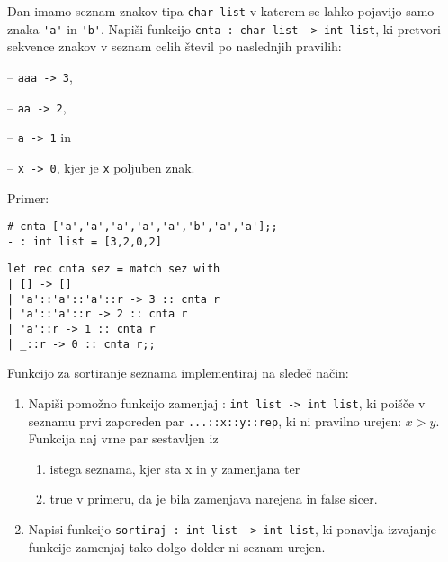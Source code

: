 \begin{ex}
  Dan imamo seznam znakov tipa \lstinline{char list} v katerem se lahko
  pojavijo samo znaka \lstinline{'a'} in \lstinline{'b'}. Napi\v si funkcijo
  \lstinline{cnta : char list -> int list}, ki pretvori sekvence znakov v
  seznam celih \v stevil po naslednjih pravilih:

    -- \lstinline{aaa -> 3},
    
    -- \lstinline{aa -> 2},
    
    -- \lstinline{a -> 1} in
    
    -- \lstinline{x -> 0}, kjer je \lstinline{x} poljuben znak.

\noindent\/Primer:
\begin{lstlisting}
# cnta ['a','a','a','a','a','b','a','a'];;
- : int list = [3,2,0,2]
\end{lstlisting}

\begin{sol}
\begin{lstlisting}
let rec cnta sez = match sez with
| [] -> []
| 'a'::'a'::'a'::r -> 3 :: cnta r 
| 'a'::'a'::r -> 2 :: cnta r 
| 'a'::r -> 1 :: cnta r 
| _::r -> 0 :: cnta r;;
\end{lstlisting}
\end{sol}

\end{ex} 
\begin{ex}
Funkcijo za sortiranje seznama implementiraj na slede\v c na\v cin:

\begin{enumerate}
\item Napi\v si pomo\v zno funkcijo zamenjaj : \lstinline{int list -> int list}, ki poi\v s\v ce v seznamu prvi zaporeden par \lstinline{...::x::y::rep}, ki ni pravilno urejen: $x>y$. Funkcija naj vrne par sestavljen iz 
	\begin{enumerate}
	\item istega seznama, kjer sta x in y zamenjana ter 
    \item true v primeru, da je bila zamenjava narejena in false sicer.
	\end{enumerate}
    \item Napisi funkcijo \lstinline{sortiraj : int list -> int list}, ki ponavlja izvajanje funkcije zamenjaj tako dolgo dokler ni seznam urejen.
\end{enumerate}
\end{ex}
